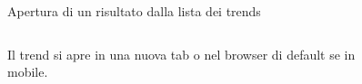 \documentclass[xcolor=svgnames, aspectratio=169]{beamer}
\begin{document}
\begin{frame}{Apertura di un risultato dalla lista dei trends}
    \begin{columns}[t]
        Il trend si apre in una nuova tab o nel browser di default se in mobile.
        
        \vspace*{-24pt}
        \begin{figure}[H]
            \centering
            \noindent{}
        \end{figure}
    \end{columns}
\end{frame}
\end{document}
